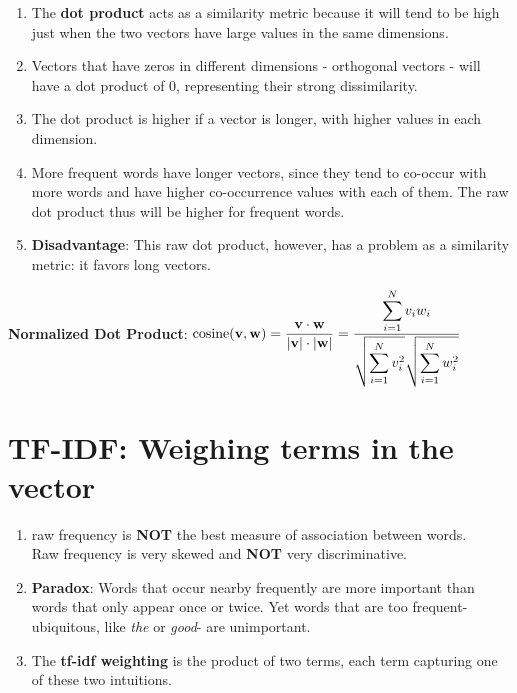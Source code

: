\begin{enumerate}
    \item The \textbf{dot product} acts as a similarity metric because it will tend to be high just when the two vectors have large values in the same dimensions. 
    
    \item Vectors that have zeros in different dimensions - orthogonal vectors - will have a dot product of 0, representing their strong dissimilarity.

    \item The dot product is higher if a vector is longer, with higher values in each dimension.
    
    \item More frequent words have longer vectors, since they tend to co-occur with more words and have higher co-occurrence values with each of them. The raw dot product thus will be higher for frequent words.

    \item \textbf{Disadvantage}: This raw dot product, however, has a problem as a similarity metric: it favors long vectors.

    
\end{enumerate}


\textbf{Normalized Dot Product}: \( \displaystyle \operatorname{cosine}(\mathbf{v,w}) = \dfrac{\mathbf{v\cdot w}}{\left| \mathbf{v} \right|\cdot\left| \mathbf{w} \right|} = \dfrac{\displaystyle\sum_{i=1}^{N} v_i w_i}{\displaystyle \sqrt{\sum_{i=1}^{N} v_i^2}\sqrt{\sum_{i=1}^{N} w_i^2}} \)


\section{TF-IDF: Weighing terms in the vector \cite{nlp-1}}\label{TF-IDF: concept}

\begin{enumerate}
    \item raw frequency is \textbf{NOT} the best measure of association between words.\\
    Raw frequency is very skewed and \textbf{NOT} very discriminative.

    \item \textbf{Paradox}: Words that occur nearby frequently are more important than words that only appear once or twice. Yet words that are too frequent-ubiquitous, like \textit{the} or \textit{good}- are unimportant.

    \item The \textbf{tf-idf weighting} is the product of two terms, each term capturing one of these two intuitions.
\end{enumerate}


